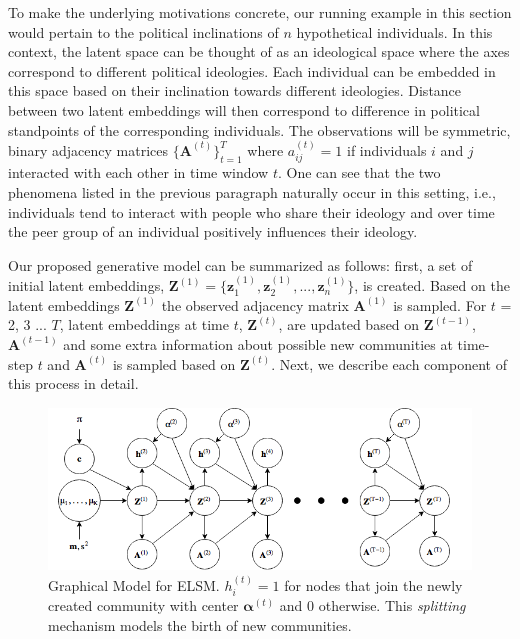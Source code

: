 \documentclass[letterpaper]{article} %
\begin{document}
To make the underlying motivations concrete, our running example in this section would pertain to the political inclinations of $n$ hypothetical individuals. In this context, the latent space can be thought of as an ideological space where the axes correspond to different political ideologies. Each individual can be embedded in this space based on their inclination towards different ideologies. Distance between two latent embeddings will then correspond to difference in political standpoints of the corresponding individuals. The observations will be symmetric, binary adjacency matrices $\mathbf{\{A}^{(t)}\}_{t=1}^T$ where $a_{ij}^{(t)} = 1$ if individuals $i$ and $j$ interacted with each other in time window $t$. One can see that the two phenomena listed in the previous paragraph naturally occur in this setting, i.e., individuals tend to interact with people who share their ideology and over time the peer group of an individual positively influences their ideology.

Our proposed generative model can be summarized as follows: first, a set of initial latent embeddings, $\mathbf{Z}^{(1)} =\{\mathbf{z}_1^{(1)}, \mathbf{z}_2^{(1)}, ..., \mathbf{z}_n^{(1)}\}$, is created. Based on the latent embeddings $\mathbf{Z}^{(1)}$ the observed adjacency matrix $\mathbf{A}^{(1)}$ is sampled. For $t$ = 2, 3 ... $T$, latent embeddings at time $t$, $\mathbf{Z}^{(t)}$, are updated based on $\mathbf{Z}^{(t-1)}$, $\mathbf{A}^{(t-1)}$ and some extra information about possible new communities at time-step $t$ and $\mathbf{A}^{(t)}$ is sampled based on $\mathbf{Z}^{(t)}$. Next, we describe each component of this process in detail.

\begin{figure}
\begin{center}
\centering
\includegraphics[width=\columnwidth]{graphical_model}
\caption{Graphical Model for ELSM. $h^{(t)}_i = 1$ for nodes that join the newly created community with center $\bm{\alpha}^{(t)}$ and $0$ otherwise. This \textit{splitting} mechanism models the birth of new communities.}
\label{fig:graphicalmodel}
\end{center}
\end{figure}
\end{document}

